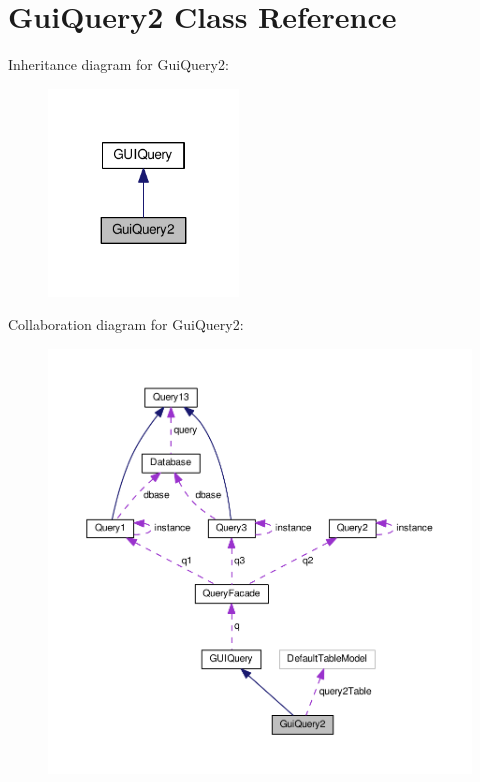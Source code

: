 \hypertarget{classGuiQuery2}{}\section{Gui\+Query2 Class Reference}
\label{classGuiQuery2}


Inheritance diagram for Gui\+Query2\+:\nopagebreak
\begin{figure}[H]
\begin{center}
\leavevmode
\includegraphics[width=143pt]{classGuiQuery2__inherit__graph}
\end{center}
\end{figure}


Collaboration diagram for Gui\+Query2\+:\nopagebreak
\begin{figure}[H]
\begin{center}
\leavevmode
\includegraphics[width=350pt]{classGuiQuery2__coll__graph}
\end{center}
\end{figure}
